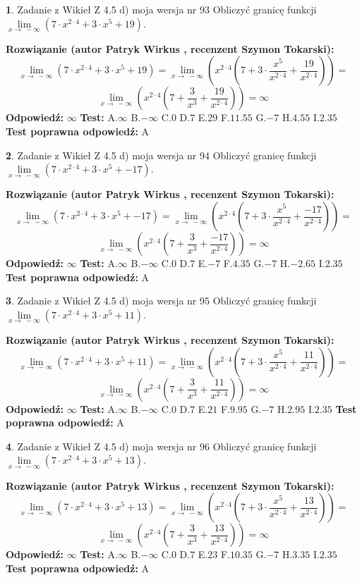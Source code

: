 \documentclass[12pt, a4paper]{article}
\theoremstyle{definition} %
\newtheorem{zad}{}
\newcommand{\zadStart}[1]{\begin{zad}#1\newline}
\newcommand{\zadStop}{\end{zad}}
\newcommand{\rozwStart}[2]{\noindent \textbf{Rozwiązanie (autor #1 , recenzent #2): }\newline}
\newcommand{\rozwStop}{\newline}
\newcommand{\odpStart}{\noindent \textbf{Odpowiedź:}\newline}
\newcommand{\odpStop}{\newline}
\newcommand{\testStart}{\noindent \textbf{Test:}\newline}
\newcommand{\testStop}{\newline}
\newcommand{\kluczStart}{\noindent \textbf{Test poprawna odpowiedź:}\newline}
\newcommand{\kluczStop}{\newline}
\begin{document}
\zadStart{Zadanie z Wikieł Z 4.5 d) moja wersja nr 93}
Obliczyć granicę funkcji  $\lim\limits_{x\to\ -\infty}(7 \cdot x^{2\cdot4}+3 \cdot x^{5}+19)$.
\zadStop
\rozwStart{Patryk Wirkus}{Szymon Tokarski}
$$\lim\limits_{x\to\ -\infty}(7 \cdot x^{2\cdot4}+3 \cdot x^{5}+19) = \lim\limits_{x\to\ -\infty}(x^{2\cdot4}(7 +3 \cdot \frac{x^{5}}{x^{2\cdot4}}+\frac{19}{x^{2\cdot4}})) =$$ $$\lim\limits_{x\to\ -\infty}(x^{2\cdot4}(7 +\frac{3}{x^{3}}+\frac{19}{x^{2\cdot4}})) =\infty$$
\rozwStop
\odpStart
$\infty$
\odpStop
\testStart
A.$\infty$ B.$-\infty$ C.$0$ D.$7$ E.$29$
F.$11.55$ G.$-7$
H.$4.55$
I.$2.35$
\testStop
\kluczStart
A
\kluczStop



\zadStart{Zadanie z Wikieł Z 4.5 d) moja wersja nr 94}
Obliczyć granicę funkcji  $\lim\limits_{x\to\ -\infty}(7 \cdot x^{2\cdot4}+3 \cdot x^{5}+-17)$.
\zadStop
\rozwStart{Patryk Wirkus}{Szymon Tokarski}
$$\lim\limits_{x\to\ -\infty}(7 \cdot x^{2\cdot4}+3 \cdot x^{5}+-17) = \lim\limits_{x\to\ -\infty}(x^{2\cdot4}(7 +3 \cdot \frac{x^{5}}{x^{2\cdot4}}+\frac{-17}{x^{2\cdot4}})) =$$ $$\lim\limits_{x\to\ -\infty}(x^{2\cdot4}(7 +\frac{3}{x^{3}}+\frac{-17}{x^{2\cdot4}})) =\infty$$
\rozwStop
\odpStart
$\infty$
\odpStop
\testStart
A.$\infty$ B.$-\infty$ C.$0$ D.$7$ E.$-7$
F.$4.35$ G.$-7$
H.$-2.65$
I.$2.35$
\testStop
\kluczStart
A
\kluczStop



\zadStart{Zadanie z Wikieł Z 4.5 d) moja wersja nr 95}
Obliczyć granicę funkcji  $\lim\limits_{x\to\ -\infty}(7 \cdot x^{2\cdot4}+3 \cdot x^{5}+11)$.
\zadStop
\rozwStart{Patryk Wirkus}{Szymon Tokarski}
$$\lim\limits_{x\to\ -\infty}(7 \cdot x^{2\cdot4}+3 \cdot x^{5}+11) = \lim\limits_{x\to\ -\infty}(x^{2\cdot4}(7 +3 \cdot \frac{x^{5}}{x^{2\cdot4}}+\frac{11}{x^{2\cdot4}})) =$$ $$\lim\limits_{x\to\ -\infty}(x^{2\cdot4}(7 +\frac{3}{x^{3}}+\frac{11}{x^{2\cdot4}})) =\infty$$
\rozwStop
\odpStart
$\infty$
\odpStop
\testStart
A.$\infty$ B.$-\infty$ C.$0$ D.$7$ E.$21$
F.$9.95$ G.$-7$
H.$2.95$
I.$2.35$
\testStop
\kluczStart
A
\kluczStop



\zadStart{Zadanie z Wikieł Z 4.5 d) moja wersja nr 96}
Obliczyć granicę funkcji  $\lim\limits_{x\to\ -\infty}(7 \cdot x^{2\cdot4}+3 \cdot x^{5}+13)$.
\zadStop
\rozwStart{Patryk Wirkus}{Szymon Tokarski}
$$\lim\limits_{x\to\ -\infty}(7 \cdot x^{2\cdot4}+3 \cdot x^{5}+13) = \lim\limits_{x\to\ -\infty}(x^{2\cdot4}(7 +3 \cdot \frac{x^{5}}{x^{2\cdot4}}+\frac{13}{x^{2\cdot4}})) =$$ $$\lim\limits_{x\to\ -\infty}(x^{2\cdot4}(7 +\frac{3}{x^{3}}+\frac{13}{x^{2\cdot4}})) =\infty$$
\rozwStop
\odpStart
$\infty$
\odpStop
\testStart
A.$\infty$ B.$-\infty$ C.$0$ D.$7$ E.$23$
F.$10.35$ G.$-7$
H.$3.35$
I.$2.35$
\testStop
\kluczStart
A
\kluczStop
\end{document}
